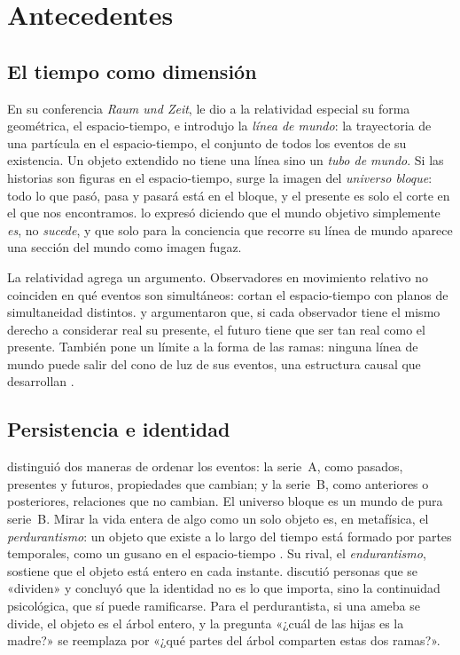 \documentclass[11pt,a4paper]{article}
\begin{document}
\section{Antecedentes}\label{sec:antecedentes}

\subsection{El tiempo como dimensión}

En su conferencia \emph{Raum und Zeit}, \textcite{minkowski1909} le dio a la relatividad especial su forma geométrica, el espacio-tiempo, e introdujo la \emph{línea de mundo}: la trayectoria de una partícula en el espacio-tiempo, el conjunto de todos los eventos de su existencia. Un objeto extendido no tiene una línea sino un \emph{tubo de mundo}. Si las historias son figuras en el espacio-tiempo, surge la imagen del \emph{universo bloque}: todo lo que pasó, pasa y pasará está en el bloque, y el presente es solo el corte en el que nos encontramos. \textcite{weyl1949} lo expresó diciendo que el mundo objetivo simplemente \emph{es}, no \emph{sucede}, y que solo para la conciencia que recorre su línea de mundo aparece una sección del mundo como imagen fugaz.

La relatividad agrega un argumento. Observadores en movimiento relativo no coinciden en qué eventos son simultáneos: cortan el espacio-tiempo con planos de simultaneidad distintos. \textcite{rietdijk1966} y \textcite{putnam1967} argumentaron que, si cada observador tiene el mismo derecho a considerar real su presente, el futuro tiene que ser tan real como el presente. También pone un límite a la forma de las ramas: ninguna línea de mundo puede salir del cono de luz de sus eventos, una estructura causal que desarrollan \textcite{hawking1973}.

\subsection{Persistencia e identidad}

\textcite{mctaggart1908} distinguió dos maneras de ordenar los eventos: la serie~A, como pasados, presentes y futuros, propiedades que cambian; y la serie~B, como anteriores o posteriores, relaciones que no cambian. El universo bloque es un mundo de pura serie~B. Mirar la vida entera de algo como un solo objeto es, en metafísica, el \emph{perdurantismo}: un objeto que existe a lo largo del tiempo está formado por partes temporales, como un gusano en el espacio-tiempo \parencite{lewis1986,sider2001}. Su rival, el \emph{endurantismo}, sostiene que el objeto está entero en cada instante. \textcite{parfit1984} discutió personas que se «dividen» y concluyó que la identidad no es lo que importa, sino la continuidad psicológica, que sí puede ramificarse. Para el perdurantista, si una ameba se divide, el objeto es el árbol entero, y la pregunta «¿cuál de las hijas es la madre?» se reemplaza por «¿qué partes del árbol comparten estas dos ramas?».
\end{document}
